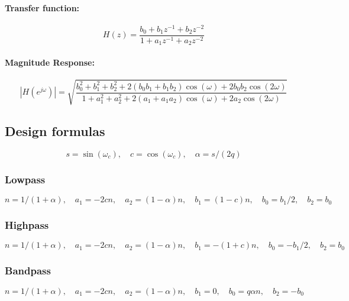 \paragraph{Transfer function:}
\begin{equation}
 H(z) = \frac{ b_0 + b_1 z^{-1} + b_2 z^{-2}} { 1 + a_1 z^{-1} + a_2 z^{-2} }
\end{equation}

\paragraph{Magnitude Response:}
\begin{equation}
 |H(e^{j \omega})| 
 = \sqrt{\frac{b_0^2 + b_1^2 + b_2^2 + 2 (b_0 b_1 + b_1 b_2) \cos (\omega) + 2 b_0 b_2 \cos(2 \omega) }
              {1     + a_1^2 + a_2^2 + 2 (    a_1 + a_1 a_2) \cos (\omega) + 2    a_2 \cos(2 \omega) } }
\end{equation}


\subsection{Design formulas}
\begin{equation}
 s = \sin(\omega_c), \quad c = \cos(\omega_c), \quad \alpha = s/(2q)
\end{equation}

\subsubsection{Lowpass}
\begin{equation}
 n = 1 / (1+\alpha), \quad a_1 = -2cn, \quad a_2 = (1-\alpha)n, \quad b_1 = (1-c)n, \quad b_0 = b_1/2, \quad b_2 = b_0
\end{equation}

\subsubsection{Highpass}
\begin{equation}
 n = 1 / (1+\alpha), \quad a_1 = -2cn, \quad a_2 = (1-\alpha)n, \quad b_1 = -(1+c)n, \quad b_0 = -b_1/2, \quad b_2 = b_0
\end{equation}

\subsubsection{Bandpass}
\begin{equation}
 n = 1 / (1+\alpha), \quad a_1 = -2cn, \quad a_2 = (1-\alpha)n, \quad b_1 = 0, \quad b_0 = q \alpha n, \quad b_2 = -b_0
\end{equation}


